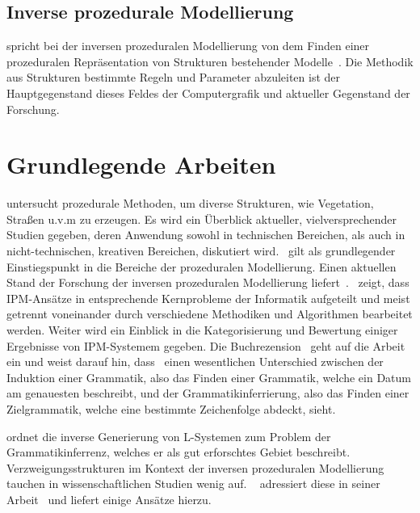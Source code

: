 \subsection*{Inverse prozedurale Modellierung}
\citeauthor{aliaga_2016} spricht bei der inversen prozeduralen Modellierung von dem Finden einer prozeduralen Repräsentation
von Strukturen bestehender Modelle~\cite{aliaga_2016}.
Die Methodik aus Strukturen bestimmte Regeln und Parameter abzuleiten ist der Hauptgegenstand dieses Feldes der
Computergrafik und aktueller Gegenstand der Forschung.

\section{Grundlegende Arbeiten}

\citeauthor{smelik_2014} untersucht prozedurale Methoden, um diverse Strukturen, wie Vegetation, Straßen u.v.m zu erzeugen.
Es wird ein Überblick aktueller, vielversprechender Studien gegeben, deren Anwendung sowohl in technischen Bereichen,
als auch in nicht-technischen, kreativen Bereichen, diskutiert wird.~\cite{smelik_2014} gilt als grundlegender Einstiegspunkt
in die Bereiche der prozeduralen Modellierung.
Einen aktuellen Stand der Forschung der inversen prozeduralen Modellierung liefert~\cite{aliaga_2016}.~
zeigt, dass IPM-Ansätze in entsprechende Kernprobleme der Informatik aufgeteilt und meist getrennt voneinander durch
verschiedene Methodiken und Algorithmen bearbeitet werden.
Weiter wird ein Einblick in die Kategorisierung und Bewertung einiger Ergebnisse von IPM-Systemem gegeben.
Die Buchrezension~\cite{daelemans_2010} geht auf die Arbeit~\cite{higuera_2010} ein und weist darauf hin, dass~\citeauthor{higuera_2010}
einen wesentlichen Unterschied zwischen der Induktion einer Grammatik, also das Finden einer
Grammatik, welche ein Datum am genauesten beschreibt, und der Grammatikinferrierung, also das Finden einer Zielgrammatik,
welche eine bestimmte Zeichenfolge abdeckt, sieht.

\newpage

\citeauthor{higuera_2010} ordnet die inverse Generierung von L-Systemen zum Problem der Grammatikinferrenz, welches er
als gut erforschtes Gebiet beschreibt.
Verzweigungsstrukturen im Kontext der inversen prozeduralen Modellierung tauchen in wissenschaftlichen Studien wenig auf.
~\cite{guo_2020} adressiert diese in seiner Arbeit~\cite{guo_2020} und liefert einige Ansätze hierzu.\\~\\

